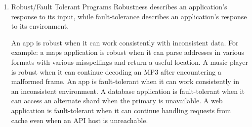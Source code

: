 \documentclass{article}
\begin{document}
\begin{enumerate}
 



\item Robust/Fault Tolerant Programs
Robustness describes an application's response to its input, while fault-tolerance describes an application's response to its environment. 

An app is robust when it can work consistently with inconsistent data. For example: a maps application is robust when it can parse addresses in various formats with various misspellings and return a useful location. A music player is robust when it can continue decoding an MP3 after encountering a malformed frame. 
An app is fault-tolerant when it can work consistently in an inconsistent environment. A database application is fault-tolerant when it can access an alternate shard when the primary is unavailable. A web application is fault-tolerant when it can continue handling requests from cache even when an API host is unreachable.
\end{enumerate}
\end{document}
